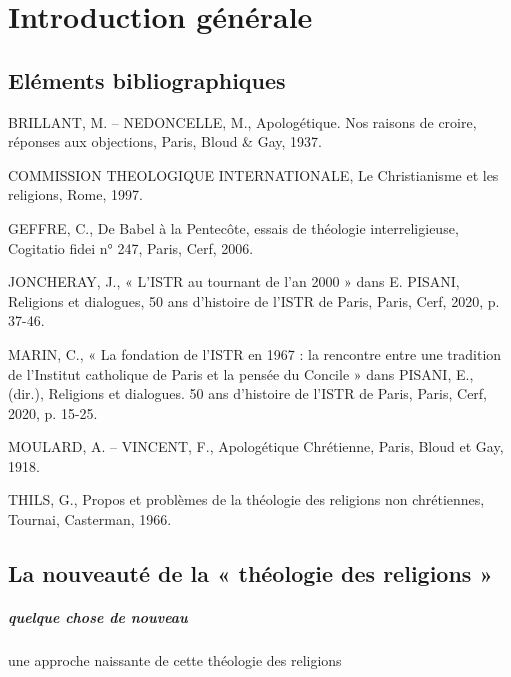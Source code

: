 \chapter{Introduction générale}

\section{Eléments bibliographiques}
\bi

\item BRILLANT, M. – NEDONCELLE, M., Apologétique. Nos raisons de croire, réponses aux
objections, Paris, Bloud & Gay, 1937.
\item COMMISSION THEOLOGIQUE INTERNATIONALE, Le Christianisme et les religions,
Rome, 1997.
\item GEFFRE, C., De Babel à la Pentecôte, essais de théologie interreligieuse, Cogitatio fidei n°
247, Paris, Cerf, 2006.
\item JONCHERAY, J., « L’ISTR au tournant de l’an 2000 » dans E. PISANI, Religions et
dialogues, 50 ans d’histoire de l’ISTR de Paris, Paris, Cerf, 2020, p. 37-46.
\item MARIN, C., « La fondation de l’ISTR en 1967 : la rencontre entre une tradition de l’Institut
catholique de Paris et la pensée du Concile » dans PISANI, E., (dir.), Religions et
dialogues. 50 ans d’histoire de l’ISTR de Paris, Paris, Cerf, 2020, p. 15-25.
\item MOULARD, A. – VINCENT, F., Apologétique Chrétienne, Paris, Bloud et Gay, 1918.
\item THILS, G., Propos et problèmes de la théologie des religions non chrétiennes, Tournai,
Casterman, 1966.
\ei

\section{La nouveauté de la « théologie des religions »}




\paragraph{quelque chose de nouveau} une approche naissante de cette théologie des religions


